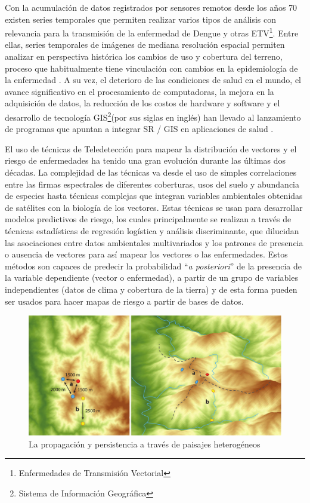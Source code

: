 \par Con la acumulación de datos registrados por sensores remotos desde los años
  70 existen series temporales que permiten realizar varios tipos de análisis con
  relevancia para la transmisión de la enfermedad de Dengue y otras
  ETV\footnote{Enfermedades de Transmisión Vectorial}.
  Entre ellas, series temporales de imágenes de mediana resolución espacial
  permiten analizar en perspectiva histórica los cambios de uso y cobertura del
  terreno, proceso que habitualmente tiene vinculación con cambios en la
  epidemiología de la enfermedad \cite{german_temporal}.
  A su vez, el deterioro de las condiciones de salud en el mundo, el avance significativo
  en el procesamiento de computadoras, la mejora en la adquisición de datos,
  la reducción de los costos de hardware y software y el desarrollo de tecnología
  GIS\footnote{Sistema de Información Geográfica}(por sus siglas en inglés) han llevado al lanzamiento
  de programas que apuntan a integrar SR / GIS en aplicaciones de salud
  \cite{tesis_riesgo_viral, tesis_gonza, espinosa_temporal, rs_public_health}.



\par El uso de técnicas de Teledetección para mapear la distribución de vectores y el riesgo
  de enfermedades ha tenido una gran evolución durante las últimas dos
  décadas. La complejidad de las técnicas va desde el uso de simples
  correlaciones entre las firmas espectrales de diferentes coberturas, usos del
  suelo y abundancia de especies hasta técnicas complejas que integran variables
  ambientales obtenidas de satélites con la biología de los vectores.
  Estas técnicas se usan para desarrollar modelos predictivos de riesgo,
  los cuales principalmente se realizan a través de técnicas estadísticas de
  regresión logística y análisis discriminante, que dilucidan las asociaciones
  entre datos ambientales multivariados y los patrones de presencia o ausencia de
  vectores para así mapear los vectores o las enfermedades.
  Estos métodos son capaces de predecir la probabilidad “\textit{a posteriori}” de la
  presencia de la variable dependiente (vector o enfermedad), a partir de un
  grupo de variables independientes (datos de clima y cobertura de la tierra) y de esta
  forma pueden ser usados para hacer mapas de riesgo a partir de bases de datos.


  \begin{figure}
  \centering%
  \includegraphics[width=1\textwidth]{images/paisajes_heterogeneos}%
  \caption{La propagación y persistencia a través de paisajes heterogéneos}\label{fig:paisajes_h}
  \end{figure}

